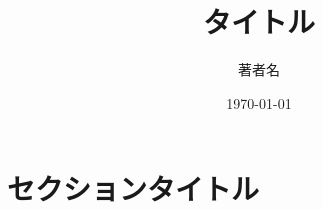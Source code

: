 \documentclass[11pt, a4paper, uplatex]{jsarticle}
\author[1]{著者名}
\affil[1]{所属}
\title{タイトル}
\date{\today}
\begin{document}
	\maketitle

   \thispagestyle{fancy}
	 \lhead{}
	 \rhead{\today}



\section{セクションタイトル}


\citet{arai2013}\\
\citep{koszegi2014}




 
\end{document}

